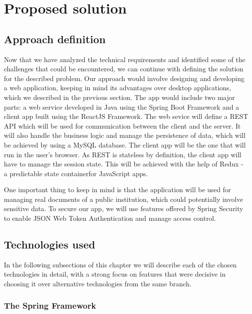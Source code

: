 \chapter{Proposed solution}
\label{chapter:proposedSolution}


\section{Approach definition}
\label{section:approachDefinition}

Now that we have analyzed the technical requirements and identified some of the challenges that could be encountered, we can continue with defining the solution for the described problem. Our approach would involve designing and developing a web application, keeping in mind its advantages over desktop applications, which we described in the previous section. The app would include two major parts: a web service developed in Java using the Spring Boot Framework and a client app built using the ReactJS Framework. The web sevice will define a REST API which will be used for communication between the client and the server. It will also handle the business logic and manage the persistence of data, which will be achieved by using a MySQL database. The client app will be the one that will run in the user's browser. As REST is stateless by definition, the client app will have to manage the session state. This will be achieved with the help of Redux - a predictable state containerfor JavaScript apps.

One important thing to keep in mind is that the application will be used for managing real documents of a public institution, which could potentially involve sensitive data. To secure our app, we will use features offered by Spring Security to enable JSON Web Token Authentication and manage access control.



\section{Technologies used}
\label{section:technologiesUsed}

In the following subsections of this chapter we will describe each of the chosen technologies in detail, with a strong focus on features that were decisive in choosing it over alternative technologies from the same branch.


\subsection{The Spring Framework}
\label{subsection:theSpringFramework}


